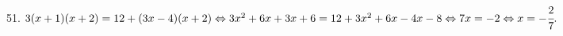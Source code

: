51. $3(x+1)(x+2)=12+(3x-4)(x+2)\Leftrightarrow 3x^2+6x+3x+6=12+3x^2+6x-4x-8\Leftrightarrow
7x=-2\Leftrightarrow x=-\cfrac{2}{7}.$\\
